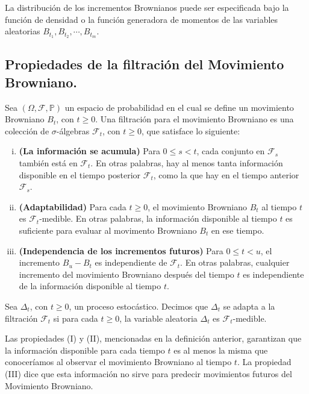 \documentclass[11pt,notitlepage]{article}
\begin{document}
 La distribución de los incrementos Brownianos puede ser especificada bajo la función de densidad o la función generadora de momentos de las variables aleatorias $B_{t_1}, B_{t_2}, \cdots, B_{t_m}.$
 
\subsection{Propiedades de la filtración del Movimiento Browniano.}

\begin{defi} \label{Secc1.10_Def1}
Sea \((\Omega, \mathcal{F}, \mathbb{P})\) un espacio de probabilidad en el cual se define un movimiento Browniano \(B_t\), con \(t \geq 0\). Una filtración para el movimiento Browniano es una colección de $\sigma$-álgebras $\mathcal{F}_t$, con \(t \geq 0\), que satisface lo siguiente:

    \begin{enumerate}[(i)]
        \item \textbf{(La información se acumula)} Para $0 \leq s <t $, cada conjunto en $\mathcal{F}_s$ también está  en $\mathcal{F}_t$. En otras palabras, hay al menos tanta información disponible en el tiempo posterior $\mathcal{F}_t$, como la que hay en el tiempo anterior $\mathcal{F}_s$.
        \item \textbf{(Adaptabilidad)}
        Para cada $t\geq0$, el movimiento Browniano \(B_t\) al tiempo \(t\) es $\mathcal{F}_t$-medible. En otras palabras, la información disponible al tiempo \(t\) es suficiente para evaluar al movimento Browniano \(B_t\) en ese tiempo.
        \item \textbf{(Independencia de los incrementos futuros)}
        Para $0 \leq t < u $, el incremento $B_u-B_t$ es independiente de $\mathcal{F}_t$. En otras palabras, cualquier incremento del movimiento Browniano después del tiempo $t$ es independiente de la información disponible al tiempo \(t\).
     \end{enumerate}
Sea $\Delta_{t}$, con $t \geq0$, un proceso estocástico. Decimos que $\Delta_{t}$ se adapta a la filtración $\mathcal{F}_t$ si para cada $t \geq0$, la variable aleatoria $\Delta_{t}$ es $\mathcal{F}_t$-medible.
\end{defi}

Las propiedades (I) y (II), mencionadas en la definición anterior, garantizan que la información disponible para cada tiempo $t$ es al menos la misma que conoceríamos al observar el movimiento Browniano al tiempo $t$. La propiedad (III) dice que esta información no sirve para predecir movimientos futuros del Movimiento Browniano.\\
\end{document}
